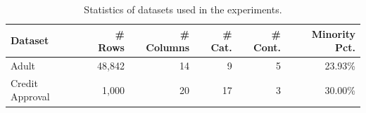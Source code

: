 \begin{table}
\centering
\caption{Statistics of datasets used in the experiments.}
\label{tab:dataset_stats}
\begin{tabular}{lrrrrr}
\toprule
Dataset & \# Rows & \# Columns & \# Cat. & \# Cont. & Minority Pct. \\
\midrule
Adult & 48,842 & 14 & 9 & 5 & 23.93\% \\
Credit Approval & 1,000 & 20 & 17 & 3 & 30.00\% \\
\bottomrule
\end{tabular}
\end{table}
